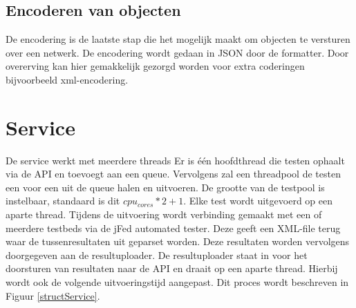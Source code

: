 \subsection{Encoderen van objecten}
\npar
De encodering is de laatste stap die het mogelijk maakt om objecten te versturen over een netwerk. De encodering wordt gedaan in JSON door de formatter. Door overerving kan hier gemakkelijk gezorgd worden voor extra coderingen bijvoorbeeld xml-encodering.
\section{Service}
\npar
De service werkt met meerdere threads Er is \'e\'en hoofdthread die testen ophaalt via de API en toevoegt aan een queue. Vervolgens zal een threadpool de testen een voor een uit de queue halen en uitvoeren. De grootte van de testpool is instelbaar, standaard is dit $cpu_{cores} * 2 + 1$.
\npar
Elke test wordt uitgevoerd op een aparte thread. Tijdens de uitvoering wordt verbinding gemaakt met een of meerdere testbeds via de jFed automated tester. Deze geeft een XML-file terug waar de tussenresultaten uit geparset worden. Deze resultaten worden vervolgens doorgegeven aan de resultuploader.
\npar
De resultuploader staat in voor het doorsturen van resultaten naar de API en draait op een aparte thread. Hierbij wordt ook de volgende uitvoeringstijd aangepast. Dit proces wordt beschreven in Figuur \ref{structService}.
\clearpage
